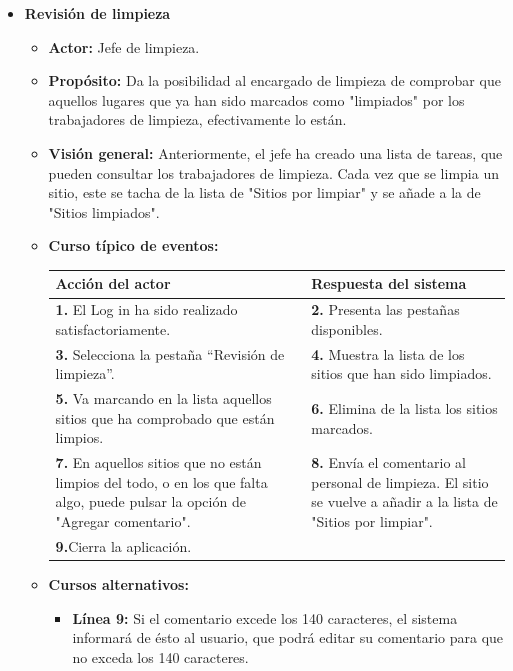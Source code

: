 \documentclass[spanish,a4paper,12pt]{report}		%
\begin{document}
\begin{itemize}
\item \textbf{Revisión de limpieza}
			\begin{itemize}
			\item \textbf{Actor: }Jefe de limpieza.
			\item \textbf{Propósito: }Da la posibilidad al encargado de limpieza de comprobar que aquellos lugares que ya han sido marcados como "limpiados" por los trabajadores de limpieza, efectivamente lo están.  		
			\item \textbf{Visión general: }Anteriormente, el jefe ha creado una lista de tareas, que pueden consultar los trabajadores de limpieza. Cada vez que se limpia un sitio, este se tacha de la lista de "Sitios por limpiar" y se añade a la de "Sitios limpiados".  
			\item \textbf{Curso típico de eventos:}\\ 	%
\begin{tabular}{|p{6cm}||p{6cm}|}
				\hline
				\textbf{Acción del actor} & \textbf{Respuesta del sistema} \\ \hline \hline
				\textbf{1.} El Log in ha sido realizado satisfactoriamente. & \textbf{2.} Presenta las pestañas disponibles.\\ \hline
				\textbf{3.} Selecciona la pestaña “Revisión de limpieza”. & \textbf{4.} Muestra la lista de los sitios que han sido limpiados. \\ \hline
				\textbf{5.} Va marcando en la lista aquellos sitios que ha comprobado que están limpios.	& \textbf{6.} Elimina de la lista los sitios marcados. \\ \hline
				\textbf{7.} En aquellos sitios que no están limpios del todo, o en los que falta algo, puede pulsar la opción de "Agregar comentario". & \textbf{8.} Envía el comentario al personal de limpieza. El sitio se vuelve a añadir a la lista de "Sitios por limpiar".\\ \hline
				\textbf{9.}Cierra la aplicación. & \textbf{} \\ \hline
			\end{tabular}
			\item \textbf{Cursos alternativos:} 
				\begin{itemize}
					\item \textbf{Línea 9: }Si el comentario excede los 140 caracteres, el sistema informará de ésto al usuario, que podrá editar su comentario para que no exceda los 140 caracteres.
				\end{itemize}
		\end {itemize}


\end{itemize}
\end{document}
